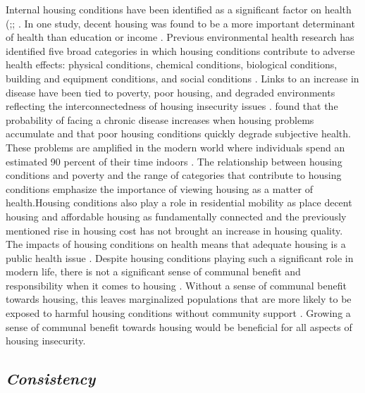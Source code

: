 Internal housing conditions have been identified as a significant factor on health (\citealp{braveman_housing_2011};\citealp{metzger_fair_2017}; \citealp{swope_housing_2020}. In one study, decent housing was found to be a more important determinant of health than education or income \citep{angel_housing_2014}. Previous environmental health research has identified five broad categories in which housing conditions contribute to adverse health effects: physical conditions, chemical conditions, biological conditions, building and equipment conditions, and social conditions \citep{jacobs_environmental_2011}. Links to an increase in disease have been tied to poverty, poor housing, and degraded environments reflecting the interconnectedness of housing insecurity issues \citep{rauh_housing_2008}.  \citet{angel_housing_2014} found that the probability of facing a chronic disease increases when housing problems accumulate and that poor housing conditions quickly degrade subjective health. These problems are amplified in the modern world where individuals spend an estimated 90 percent of their time indoors \citep{palacios_impact_2021}. The relationship between housing conditions and poverty and the range of categories that contribute to housing conditions emphasize the importance of viewing housing as a matter of health.Housing conditions also play a role in residential mobility as \citet{desmond_housing_2015} place decent housing and affordable housing as fundamentally connected and the previously mentioned rise in housing cost has not brought an increase in housing quality. The impacts of housing conditions on health means that adequate housing is a public health issue \citep{matte_housing_2000}. Despite housing conditions playing such a significant role in modern life, there is not a significant sense of communal benefit and responsibility when it comes to housing \citep{jacobs_environmental_2011}.  Without a sense of communal benefit towards housing, this leaves marginalized populations that are more likely to be exposed to harmful housing conditions without community support \citep{swope_housing_2020}. Growing a sense of communal benefit towards housing would be beneficial for all aspects of housing insecurity. 

\subsection{\textit{Consistency}} 

